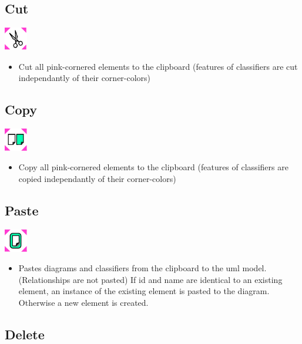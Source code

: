 \subsection{Cut}

\includegraphics[width=1cm]{../../gui/source/resources/edit_cut.pdf}
\begin{itemize}
\item Cut all pink-cornered elements to the clipboard (features of classifiers are cut independantly of their corner-colors)
\end{itemize}

\subsection{Copy}

\includegraphics[width=1cm]{../../gui/source/resources/edit_copy.pdf}
\begin{itemize}
\item Copy all pink-cornered elements to the clipboard (features of classifiers are copied independantly of their corner-colors)
\end{itemize}

\subsection{Paste}

\includegraphics[width=1cm]{../../gui/source/resources/edit_paste.pdf}
\begin{itemize}
\item Pastes diagrams and classifiers from the clipboard to the uml model. (Relationships are not pasted)
    If id and name are identical to an existing element, an instance of the existing element is pasted to the diagram.
    Otherwise a new element is created.
\end{itemize}

\subsection{Delete}

